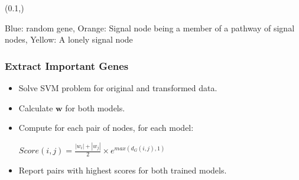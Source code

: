 \documentclass{beamer}
\begin{document}
\begin{frame}
{\begin{figure}
  \end{figure}
  \begin{textblock*}{\paperwidth}(0.1\textwidth,\textheight)
    \raggedright
    \tiny{{\color{blue}Blue}: random gene, {\color{orange}Orange}: Signal node being a member of a pathway of signal nodes, {\color{yellow}Yellow}: A lonely signal node}
  \end{textblock*}
}
\end{frame}

\begin{frame}
  \frametitle{Extract Important Genes}
  \begin{itemize}
  \item Solve SVM problem for original and transformed data.
  \item Calculate $\mathbf{w}$ for both models.
  \item Compute for each pair of nodes, for each model: 
    \begin{block}{}
      $Score(i, j) = \frac{|w_i| + |w_j|}{2} \times e^{max\left(d_G(i, j), 1\right)}$
    \end{block}
  \item Report pairs with highest scores for both trained models.
  \end{itemize}
\end{frame}
\end{document}
